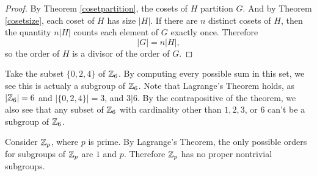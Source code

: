 \begin{proof}
By Theorem \ref{cosetpartition}, the cosets of $H$ partition $G$. And by Theorem \ref{cosetsize}, each coset of $H$ has size $|H|$. If there are $n$ distinct cosets of $H$, then the quantity $n|H|$ counts each element of $G$ exactly once. Therefore
\begin{equation*}
    |G| = n|H|\mathrm{,}
\end{equation*}
so the order of $H$ is a divisor of the order of $G$.

\end{proof}

\begin{example}
Take the subset $\{0, 2, 4\}$ of $\zn[6]$. By computing every possible sum in this set, we see this is actualy a subgroup of $\zn[6]$. Note that Lagrange's Theorem holds, as $\left|\zn[6]\right| = 6$ and $|\{0, 2, 4\}| = 3$, and $3|6$. By the contrapositive of the theorem, we also see that any subset of $\zn[6]$ with cardinality other than $1, 2, 3$, or $6$ can't be a subgroup of $\zn[6]$.
\end{example}

\begin{example}
Consider $\zn[p]$, where $p$ is prime. By Lagrange's Theorem, the only possible orders for subgroups of $\zn[p]$ are $1$ and $p$. Therefore $\zn[p]$ has no proper nontrivial subgroups.
\end{example}